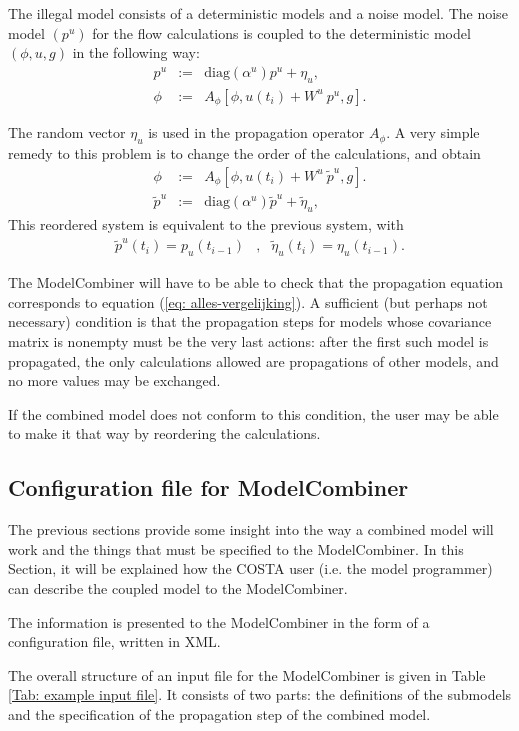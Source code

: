 \documentclass[a4paper,12pt]{article}
\begin{document}
The illegal model consists of a deterministic models and a noise model.
The noise model $(p^u)$ for the flow calculations is coupled to
the deterministic model $(\phi,u,g)$ 
in the following way:
\begin{eqnarray}
 p^u &:=& \mbox{diag}(\alpha^u) p^u + \eta_u,
\nonumber \\
 \phi &:=& A_\phi[\phi,u(t_i)+W^u~p^u,g].
\end{eqnarray}

The random vector $\eta_u$ is used in the propagation operator $A_\phi$. 
A very simple remedy to this problem is to change the order of the 
calculations, and obtain
\begin{eqnarray}
 \phi &:=& A_\phi[\phi,u(t_i)+W^u~\tilde p^u,g].
\nonumber \\
 \tilde p^u &:=& \mbox{diag}(\alpha^u) \tilde p^u + \tilde \eta_u,
\end{eqnarray}
This reordered system is equivalent to the previous system, with 
\begin{eqnarray}
 \tilde p^u(t_i)  = p_u(t_{i-1}) &,& 
\tilde \eta_u(t_i) = \eta_u(t_{i-1}).
\end{eqnarray}

The ModelCombiner will have to be able to check that the propagation
equation corresponds to equation (\ref{eq: alles-vergelijking}). 
A sufficient (but perhaps not necessary) condition is that the propagation 
steps for models whose covariance matrix is nonempty must be the very last 
actions: after the first such model is propagated, the only calculations
allowed are propagations of other models, and no more values may be
exchanged.

If the combined model does not conform to this condition, the user may be 
able to make it that way by reordering the calculations.


\subsection{Configuration file for ModelCombiner}
\label{Sec: usage}
The previous sections provide some insight into the way a combined 
model will work and the things that must be specified to the ModelCombiner.
In this Section, it will be explained how the COSTA user (i.e. the model 
programmer) can describe the coupled model to the ModelCombiner.

The information is presented to the ModelCombiner in the form of a 
configuration file, written in XML.

The overall structure of an input file for the ModelCombiner is given
in Table \ref{Tab: example input file}. It consists of two parts: the 
definitions of the submodels and the specification of the propagation step 
of the combined model.
\end{document}
